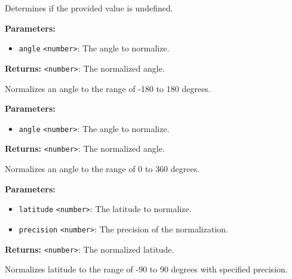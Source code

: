 \documentclass[12pt,a4paper]{article}
\begin{document}
\noindent Determines if the provided value is undefined.

\vspace{5mm}
\noindent {}


\noindent \textbf{Parameters:}
\begin{itemize}
  \item \texttt{angle} \texttt{<number>}: The angle to normalize.
\end{itemize}

\noindent \textbf{Returns:} \texttt{<number>}: The normalized angle.

\noindent Normalizes an angle to the range of -180 to 180 degrees.

\vspace{5mm}
\noindent {}


\noindent \textbf{Parameters:}
\begin{itemize}
  \item \texttt{angle} \texttt{<number>}: The angle to normalize.
\end{itemize}

\noindent \textbf{Returns:} \texttt{<number>}: The normalized angle.

\noindent Normalizes an angle to the range of 0 to 360 degrees.

\vspace{5mm}
\noindent {}


\noindent \textbf{Parameters:}
\begin{itemize}
  \item \texttt{latitude} \texttt{<number>}: The latitude to normalize.
  \item \texttt{precision} \texttt{<number>}: The precision of the normalization.
\end{itemize}

\noindent \textbf{Returns:} \texttt{<number>}: The normalized latitude.

\noindent Normalizes latitude to the range of -90 to 90 degrees with specified precision.

\vspace{5mm}
\noindent {}
\end{document}
